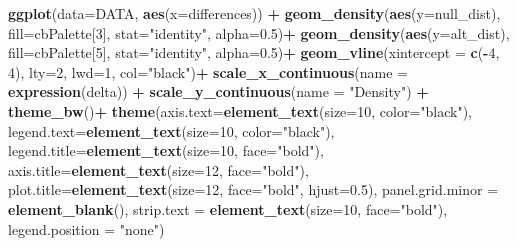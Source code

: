 \documentclass[
]{article}
\newenvironment{Shaded}{\begin{snugshade}}{\end{snugshade}}
\newcommand{\AttributeTok}[1]{\textcolor[rgb]{0.13,0.29,0.53}{#1}}
\newcommand{\DecValTok}[1]{\textcolor[rgb]{0.00,0.00,0.81}{#1}}
\newcommand{\FloatTok}[1]{\textcolor[rgb]{0.00,0.00,0.81}{#1}}
\newcommand{\FunctionTok}[1]{\textcolor[rgb]{0.13,0.29,0.53}{\textbf{#1}}}
\newcommand{\NormalTok}[1]{#1}
\newcommand{\SpecialCharTok}[1]{\textcolor[rgb]{0.81,0.36,0.00}{\textbf{#1}}}
\newcommand{\StringTok}[1]{\textcolor[rgb]{0.31,0.60,0.02}{#1}}
\begin{document}
\begin{Shaded}
\begin{Highlighting}[]
\FunctionTok{ggplot}\NormalTok{(}\AttributeTok{data=}\NormalTok{DATA, }\FunctionTok{aes}\NormalTok{(}\AttributeTok{x=}\NormalTok{differences)) }\SpecialCharTok{+}
  \FunctionTok{geom\_density}\NormalTok{(}\FunctionTok{aes}\NormalTok{(}\AttributeTok{y=}\NormalTok{null\_dist), }\AttributeTok{fill=}\NormalTok{cbPalette[}\DecValTok{3}\NormalTok{], }\AttributeTok{stat=}\StringTok{"identity"}\NormalTok{, }\AttributeTok{alpha=}\FloatTok{0.5}\NormalTok{)}\SpecialCharTok{+}
  \FunctionTok{geom\_density}\NormalTok{(}\FunctionTok{aes}\NormalTok{(}\AttributeTok{y=}\NormalTok{alt\_dist), }\AttributeTok{fill=}\NormalTok{cbPalette[}\DecValTok{5}\NormalTok{], }\AttributeTok{stat=}\StringTok{"identity"}\NormalTok{, }\AttributeTok{alpha=}\FloatTok{0.5}\NormalTok{)}\SpecialCharTok{+}
  \FunctionTok{geom\_vline}\NormalTok{(}\AttributeTok{xintercept =} \FunctionTok{c}\NormalTok{(}\SpecialCharTok{{-}}\DecValTok{4}\NormalTok{, }\DecValTok{4}\NormalTok{), }\AttributeTok{lty=}\DecValTok{2}\NormalTok{, }\AttributeTok{lwd=}\DecValTok{1}\NormalTok{, }\AttributeTok{col=}\StringTok{"black"}\NormalTok{)}\SpecialCharTok{+}
  \FunctionTok{scale\_x\_continuous}\NormalTok{(}\AttributeTok{name =} \FunctionTok{expression}\NormalTok{(delta)) }\SpecialCharTok{+}
  \FunctionTok{scale\_y\_continuous}\NormalTok{(}\AttributeTok{name =} \StringTok{"Density"}\NormalTok{) }\SpecialCharTok{+}
  \FunctionTok{theme\_bw}\NormalTok{()}\SpecialCharTok{+}
  \FunctionTok{theme}\NormalTok{(}\AttributeTok{axis.text=}\FunctionTok{element\_text}\NormalTok{(}\AttributeTok{size=}\DecValTok{10}\NormalTok{, }\AttributeTok{color=}\StringTok{"black"}\NormalTok{),}
        \AttributeTok{legend.text=}\FunctionTok{element\_text}\NormalTok{(}\AttributeTok{size=}\DecValTok{10}\NormalTok{, }\AttributeTok{color=}\StringTok{"black"}\NormalTok{),}
        \AttributeTok{legend.title=}\FunctionTok{element\_text}\NormalTok{(}\AttributeTok{size=}\DecValTok{10}\NormalTok{, }\AttributeTok{face=}\StringTok{"bold"}\NormalTok{),}
        \AttributeTok{axis.title=}\FunctionTok{element\_text}\NormalTok{(}\AttributeTok{size=}\DecValTok{12}\NormalTok{, }\AttributeTok{face=}\StringTok{"bold"}\NormalTok{),}
        \AttributeTok{plot.title=}\FunctionTok{element\_text}\NormalTok{(}\AttributeTok{size=}\DecValTok{12}\NormalTok{, }\AttributeTok{face=}\StringTok{"bold"}\NormalTok{, }\AttributeTok{hjust=}\FloatTok{0.5}\NormalTok{),}
        \AttributeTok{panel.grid.minor =} \FunctionTok{element\_blank}\NormalTok{(),}
        \AttributeTok{strip.text =} \FunctionTok{element\_text}\NormalTok{(}\AttributeTok{size=}\DecValTok{10}\NormalTok{, }\AttributeTok{face=}\StringTok{"bold"}\NormalTok{),}
        \AttributeTok{legend.position =} \StringTok{"none"}\NormalTok{)}
\end{Highlighting}
\end{Shaded}
\end{document}
